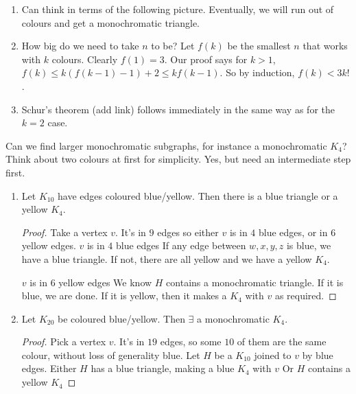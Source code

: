 \documentclass{article}
\begin{document}
\begin{remark}
    \leavevmode
    \begin{enumerate}
        \item Can think in terms of the following picture. Eventually, we will run out of colours and get a monochromatic triangle.
        \item How big do we need to take $n$ to be?  Let $f(k)$ be the smallest $n$ that works with $k$ colours. Clearly $f(1) = 3$. Our proof says for $k>1$, $f(k) \leq k \left(f(k-1)-1\right) + 2 \leq k f(k-1)$.  So by induction, $f(k) < 3 k!$.
        \item Schur's theorem (add link) follows immediately in the same way as for the $k=2$ case.
    \end{enumerate}
\end{remark}

Can we find larger monochromatic subgraphs, for instance a monochromatic $K_4$?  Think about two colours at first for simplicity.  Yes, but need an intermediate step first.

\begin{eg}
    \leavevmode
    \begin{enumerate}
        \item Let $K_{10}$ have edges coloured blue/yellow.
            Then there is a blue triangle or a yellow $K_4$.
            \begin{proof}
                Take a vertex $v$. It's in $9$ edges so either $v$ is in $4$ blue edges, or in $6$ yellow edges.
                $v$ is in $4$ blue edges
                If any edge between $w, x, y, z$ is blue, we have a blue triangle.
                If not, there are all yellow and we have a yellow $K_4$.

                $v$ is in $6$ yellow edges We know $H$ contains a monochromatic triangle. If it is blue, we are done.  If it is yellow, then it makes a $K_4$ with $v$ as required.
            \end{proof}
        \item Let $K_{20}$ be coloured blue/yellow. Then $\exists$ a monochromatic $K_4$.
            \begin{proof}
                Pick a vertex $v$. It's in $19$ edges, so some $10$ of them are the same colour, without loss of generality blue.
                Let $H$ be a $K_{10}$ joined to $v$ by blue edges.
                Either $H$ has a blue triangle, making a blue $K_4$ with $v$
                Or $H$ contains a yellow $K_4$
            \end{proof}
    \end{enumerate}
\end{eg}
\end{document}
